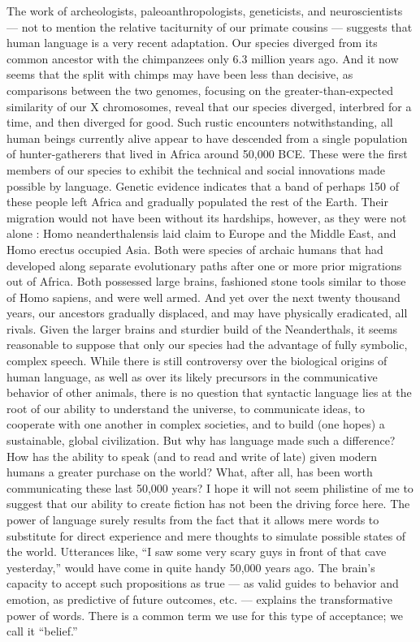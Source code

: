 \documentclass[a4paper,14pt]{extbook}
\begin{document}
The work of archeologists, paleoanthropologists, geneticists, and neuroscientists --- not to mention the relative taciturnity of our primate cousins --- suggests that human language is a very recent adaptation.
Our species diverged from its common ancestor with the chimpanzees only 6.3 million years ago.
And it now seems that the split with chimps may have been less than decisive, as comparisons between the two genomes, focusing on the greater-than-expected similarity of our X chromosomes, reveal that our species diverged, interbred for a time, and then diverged for good.
Such rustic encounters notwithstanding, all human beings currently alive appear to have descended from a single population of hunter-gatherers that lived in Africa around 50,000 BCE.
These were the first members of our species to exhibit the technical and social innovations made possible by language.
Genetic evidence indicates that a band of perhaps 150 of these people left Africa and gradually populated the rest of the Earth.
Their migration would not have been without its hardships, however, as they were not alone :
Homo neanderthalensis laid claim to Europe and the Middle East, and Homo erectus occupied Asia.
Both were species of archaic humans that had developed along separate evolutionary paths after one or more prior migrations out of Africa.
Both possessed large brains, fashioned stone tools similar to those of Homo sapiens, and were well armed.
And yet over the next twenty thousand years, our ancestors gradually displaced, and may have physically eradicated, all rivals.
Given the larger brains and sturdier build of the Neanderthals, it seems reasonable to suppose that only our species had the advantage of fully symbolic, complex speech.
While there is still controversy over the biological origins of human language, as well as over its likely precursors in the communicative behavior of other animals, there is no question that syntactic language lies at the root of our ability to understand the universe, to communicate ideas, to cooperate with one another in complex societies, and to build (one hopes) a sustainable, global civilization.
But why has language made such a difference?
How has the ability to speak (and to read and write of late) given modern humans a greater purchase on the world?
What, after all, has been worth communicating these last 50,000 years?
I hope it will not seem philistine of me to suggest that our ability to create fiction has not been the driving force here.
The power of language surely results from the fact that it allows mere words to substitute for direct experience and mere thoughts to simulate possible states of the world.
Utterances like, “I saw some very scary guys in front of that cave yesterday,” would have come in quite handy 50,000 years ago.
The brain’s capacity to accept such propositions as true --- as valid guides to behavior and emotion, as predictive of future outcomes, etc. --- explains the transformative power of words.
There is a common term we use for this type of acceptance; we call it ``belief.''
\end{document}
